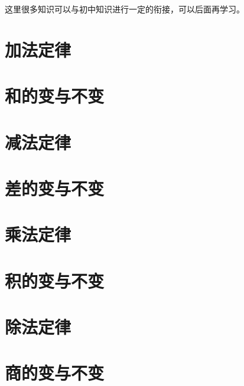 
\setcounter{section}{0} 


\begin{parchmentquote}
    这里很多知识可以与初中知识进行一定的衔接，可以后面再学习。
\end{parchmentquote}






\section{加法定律}
\section{和的变与不变}

\section{减法定律}
\section{差的变与不变}

\section{乘法定律}
\section{积的变与不变}
\section{除法定律}
\section{商的变与不变}
\newpage







